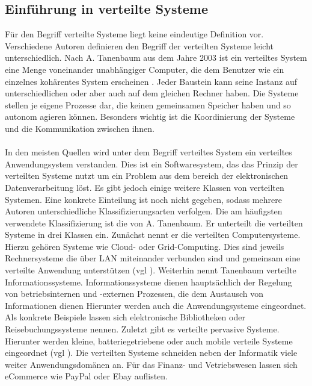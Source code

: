\documentclass[utf8,biblatex]{lni}
\begin{document}
\subsection{Einführung in verteilte Systeme}\label{EinfuerungInVerteilteSysteme}

Für den Begriff \glqq verteilte Systeme \grqq{} liegt keine eindeutige Definition vor. Verschiedene Autoren definieren den Begriff der verteilten Systeme leicht unterschiedlich.
Nach A. Tanenbaum aus dem Jahre 2003 ist ein verteiltes System eine Menge voneinander unabhängiger Computer, die dem Benutzer wie ein einzelnes kohärentes System
erscheinen \citet{Mandl.2009}. Jeder Baustein kann seine Instanz auf unterschiedlichen oder aber auch auf dem gleichen Rechner haben. Die Systeme stellen je eigene Prozesse dar,
 die keinen gemeinsamen
Speicher haben und so autonom agieren können. Besonders wichtig ist die Koordinierung der Systeme und die Kommunikation zwischen ihnen.
\\\\
In den meisten Quellen wird unter dem Begriff verteiltes System ein verteiltes Anwendungsystem verstanden. Dies ist ein Softwaresystem, das das Prinzip der verteilten Systeme 
nutzt um ein 
Problem aus dem bereich der elektronischen Datenverarbeitung löst. Es gibt jedoch einige weitere Klassen von verteilten Systemen. Eine konkrete Einteilung ist noch nicht gegeben, sodass
mehrere Autoren unterschiedliche Klassifizierungsarten verfolgen. Die am häufigsten verwendete Klassifizierung ist die von A. Tanenbaum. Er unterteilt die verteilten Systeme
in drei Klassen ein. Zunächst nennt er die verteilten Computersysteme. Hierzu gehören Systeme wie Cloud- oder Grid-Computing. Dies sind jeweils Rechnersysteme die über LAN miteinander verbunden
sind und gemeinsam eine verteilte Anwendung unterstützen (vgl \citet{Mandl.2009}). Weiterhin nennt Tanenbaum verteilte Informationssysteme.
Informationssysteme dienen hauptsächlich der Regelung von betriebsinternen und -externen Prozessen, die dem Austausch von Informationen dienen \citet{Lackes.o.J.}
Hierunter werden auch die Anwendungsysteme eingeordnet. Als konkrete Beispiele lassen sich elektronische Bibliotheken oder Reisebuchungssysteme nennen.
Zuletzt gibt es verteilte pervasive Systeme. Hierunter werden kleine, batteriegetriebene oder auch mobile verteile Systeme eingeordnet (vgl \citet{Mandl.2009}).
\newline
Die verteilten Systeme schneiden neben der Informatik viele weiter Anwendungsdomänen an. Für das Finanz- und Vetriebswesen lassen sich eCommerce wie PayPal oder Ebay auflisten. 
\end{document}
